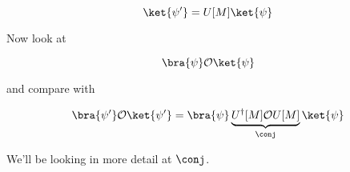 \begin{equation}\label{eqn:qmTwoL18:510}
\ket{\psi'} = U[M] \ket{\psi}
\end{equation}

Now look at 

\begin{equation}\label{eqn:qmTwoL18:530}
\bra{\psi} \mathcal{O} \ket{\psi}
\end{equation}

and compare with

\begin{equation}\label{eqn:qmTwoL18:550}
\bra{\psi'} \mathcal{O} \ket{\psi'}
=
\bra{\psi} \underbrace{U^\dagger[M] \mathcal{O} U[M]}_{\conj} \ket{\psi}
\end{equation}

We'll be looking in more detail at $\conj$.

\EndArticle
